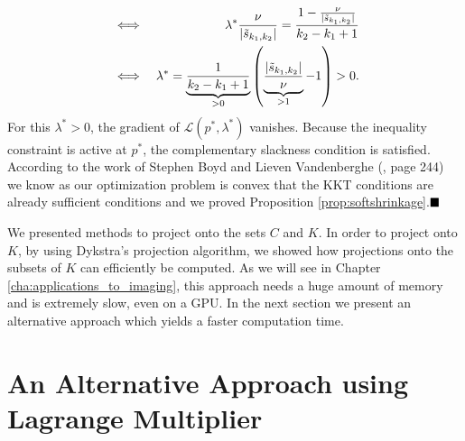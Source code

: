 \documentclass[abstracton]{scrreprt}
\newcommand{\qed}{$\hfill\blacksquare$}
\newenvironment{proof}[1][Proof]{\begin{trivlist}
\item[\hskip \labelsep {\bfseries #1}]}{\end{trivlist}}
\begin{document}
\begin{proof}
\begin{eqnarray}
                        &\iff& \lambda^{\ast}\frac{\nu}{|\tilde{s}_{k_{1}, k_{2}}|} = \frac{1 - \frac{\nu}{|\tilde{s}_{k_{1}, k_{2}}|}}{k_{2} - k_{1} + 1} \notag \\
                        &\iff& \lambda^{\ast} = \underbrace{\frac{1}{k_{2} - k_{1} + 1}}_{> 0} \left( \underbrace{\frac{|\tilde{s}_{k_{1}, k_{2}}|}{\nu}}_{> 1} - 1 \right) > 0. \notag
                    \end{eqnarray}
                For this $\lambda^{\ast} > 0$, the gradient of $\mathcal{L}(p^{\ast}, \lambda^{\ast})$ vanishes. Because the inequality constraint is active at $p^{\ast}$, the complementary slackness condition is satisfied. According to the work of Stephen Boyd and Lieven Vandenberghe (\cite{Boyd}, page 244) we know as our optimization problem is convex that the KKT conditions are already sufficient conditions and we proved Proposition \ref{prop:softshrinkage}.\qed
            \end{proof}
    We presented methods to project onto the sets $C$ and $K$. In order to project onto $K$, by using Dykstra's projection algorithm, we showed how projections onto the subsets of $K$ can efficiently be computed. As we will see in Chapter \ref{cha:applications_to_imaging}, this approach needs a huge amount of memory and is extremely slow, even on a GPU. In the next section we present an alternative approach which yields a faster computation time.
    \section{An Alternative Approach using Lagrange Multiplier} %
    \label{sec:an_alternative_approach_using_lagrangre_multipliers}
        
\end{document}
